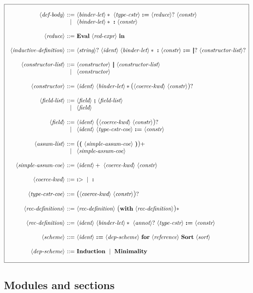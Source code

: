 \documentclass{article}
\makeatletter
\def\bfbar{\ensuremath{|\hskip -0.22em{}|\hskip -0.24em{}|}}
\def\TERMbar{\bfbar}
\def\GR#1{\text{\large(}#1\text{\large)}}
\def\NT#1{\langle\textit{#1}\rangle}
\def\TERM#1{{\bf\textrm{\bf #1}}}
\def\KWD#1{\TERM{#1}}
\def\STAR#1{#1*}
\def\STARGR#1{\GR{#1}*}
\def\PLUS#1{#1+}
\def\OPT#1{#1?}
\def\OPTGR#1{\GR{#1}?}
\newenvironment{cadre}
        {\begin{array}{|c|}\hline\\}
        {\\\\\hline\end{array}}
\newenvironment{rulebox}
        {$$\begin{cadre}\begin{array}{r@{~}c@{~}l@{}l@{}r}}
        {\end{array}\end{cadre}$$}
\def\DEFNT#1{\NT{#1} & ::= &}
\def\SEPDEF{\\\\}
\def\nlsep{\\&|&}
\newenvironment{rules}
        {\begin{center}\begin{rulebox}}
        {\end{rulebox}\end{center}}
\makeatother
\begin{document}
\begin{rules}
\DEFNT{def-body}
       \STAR{\NT{binder-let}}~\NT{type-cstr}~\KWD{:=}
       ~\OPT{\NT{reduce}}~\NT{constr}
\nlsep \STAR{\NT{binder-let}}~\KWD{:}~\NT{constr}
\SEPDEF
\DEFNT{reduce}
       \TERM{Eval}~\NT{red-expr}~\KWD{in}
\SEPDEF
\DEFNT{inductive-definition}
       \OPT{\NT{string}}~\NT{ident}~\STAR{\NT{binder-let}}~\KWD{:}
       ~\NT{constr}~\KWD{:=}
       ~\OPT{\TERMbar}~\OPT{\NT{constructor-list}}
\SEPDEF
\DEFNT{constructor-list}
       \NT{constructor}~\TERMbar~\NT{constructor-list}
\nlsep \NT{constructor}
\SEPDEF
\DEFNT{constructor}
       \NT{ident}~\STAR{\NT{binder-let}}\OPTGR{\NT{coerce-kwd}~\NT{constr}}
\SEPDEF
\DEFNT{field-list}
       \NT{field}~\KWD{;}~\NT{field-list}
\nlsep \NT{field}
\SEPDEF
\DEFNT{field}
       \NT{ident}~\OPTGR{\NT{coerce-kwd}~\NT{constr}}
\nlsep \NT{ident}~\NT{type-cstr-coe}~\KWD{:=}~\NT{constr}
\SEPDEF
\DEFNT{assum-list}
       \PLUS{\GR{\KWD{(}~\NT{simple-assum-coe}~\KWD{)}}}
\nlsep \NT{simple-assum-coe}
\SEPDEF
\DEFNT{simple-assum-coe}
       \PLUS{\NT{ident}}~\NT{coerce-kwd}~\NT{constr}
\SEPDEF
\DEFNT{coerce-kwd} \TERM{:$>$} ~\mid~ \KWD{:}
\SEPDEF
\DEFNT{type-cstr-coe} \OPTGR{\NT{coerce-kwd}~\NT{constr}}
\SEPDEF
\DEFNT{rec-definitions}
       \NT{rec-definition}~\STARGR{\KWD{with}~\NT{rec-definition}}
\SEPDEF
\DEFNT{rec-definition}
       \NT{ident}~\STAR{\NT{binder-let}}~\OPT{\NT{annot}}~\NT{type-cstr}
       ~\KWD{:=}~\NT{constr}
\SEPDEF
\DEFNT{scheme}
       \NT{ident}~\KWD{:=}~\NT{dep-scheme}~\KWD{for}~\NT{reference}
       ~\TERM{Sort}~\NT{sort}
\SEPDEF
\DEFNT{dep-scheme}
       \TERM{Induction}~\mid~\TERM{Minimality}
\end{rules}

\subsection{Modules and sections}
\end{document}
